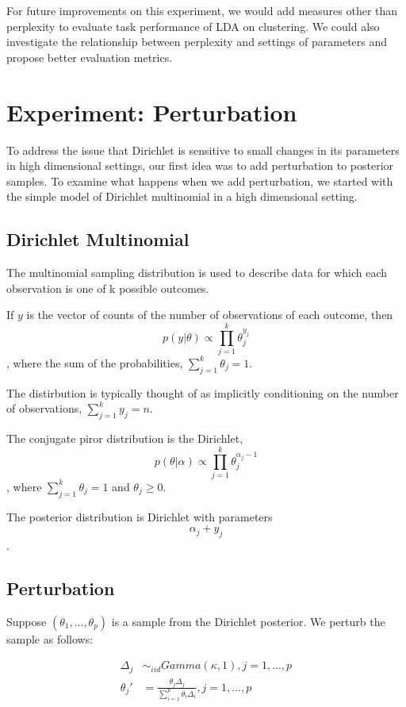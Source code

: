 \documentclass{article}
\begin{document}
For future improvements on this experiment, we would add measures other than perplexity to evaluate task performance of LDA on clustering. We could also investigate the relationship between perplexity and settings of parameters and propose better evaluation metrics.


\section{Experiment: Perturbation}

To address the issue that Dirichlet is sensitive to small changes in its parameters in high dimensional settings, our first idea was to add perturbation to posterior samples. To examine what happens when we add perturbation, we started with the simple model of Dirichlet multinomial in a high dimensional setting.

\subsection{Dirichlet Multinomial}

The multinomial sampling distribution is used to describe data for which each observation is one of k possible outcomes.

If $y$ is the vector of counts of the number of observations of each outcome, then $$p(y|\theta) \propto \prod_{j = 1}^k \theta_j^{y_j}$$, where the sum of the probabilities, $\sum_{j = 1}^k \theta_j = 1$.

The distirbution is typically thought of as implicitly conditioning on the number of observations, $\sum_{j = 1}^k y_j = n$.

The conjugate piror distribution is the Dirichlet, $$p(\theta|\alpha) \propto \prod_{j = 1}^k \theta_j^{\alpha_j - 1}$$, where $\sum_{j = 1}^k \theta_j = 1$ and $\theta_j \geq 0$.

The posterior distribution is Dirichlet with parameters $$\alpha_j + y_j$$.

\subsection{Perturbation}

Suppose $(\theta_1, ..., \theta_p)$ is a sample from the Dirichlet posterior. We perturb the sample as follows:

$$
\begin{aligned}
\Delta_j & \sim_{iid} Gamma(\kappa, 1), j = 1, ..., p \\
\theta_j' & = \frac{\theta_j \Delta_j}{\sum_{i = 1}^p \theta_i \Delta_i}, j = 1, ..., p
\end{aligned}
$$
\end{document}
